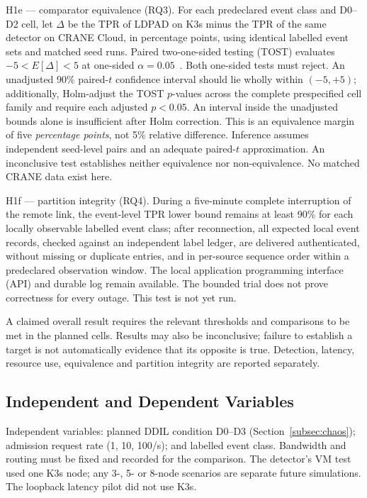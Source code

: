 \documentclass{ieeeaccess}
\renewcommand{\textbf}[1]{#1}
\begin{document}
\noindent\textbf{H1e --- comparator equivalence (RQ3).} For each predeclared event class and D0--D2 cell, let $\Delta$ be the TPR of LDPAD on K3s minus the TPR of the same detector on CRANE Cloud, in percentage points, using identical labelled event sets and matched seed runs. Paired two-one-sided testing (TOST) evaluates $-5< E[\Delta] <5$ at one-sided $\alpha=0.05$~\cite{b_tost}. Both one-sided tests must reject. An unadjusted 90\% paired-$t$ confidence interval should lie wholly within $(-5,+5)$; additionally, Holm-adjust the TOST $p$-values across the complete prespecified cell family and require each adjusted $p<0.05$. An interval inside the unadjusted bounds alone is insufficient after Holm correction. This is an equivalence margin of five \emph{percentage points}, not 5\% relative difference. Inference assumes independent seed-level pairs and an adequate paired-$t$ approximation. An inconclusive test establishes neither equivalence nor non-equivalence. No matched CRANE data exist here.

\noindent\textbf{H1f --- partition integrity (RQ4).} During a five-minute complete interruption of the remote link, the event-level TPR lower bound remains at least 90\% for each locally observable labelled event class; after reconnection, all expected local event records, checked against an independent label ledger, are delivered authenticated, without missing or duplicate entries, and in per-source sequence order within a predeclared observation window. The local application programming interface (API) and durable log remain available. The bounded trial does not prove correctness for every outage. This test is not yet run.

A claimed overall result requires the relevant thresholds and comparisons to be met in the planned cells. Results may also be inconclusive; failure to establish a target is not automatically evidence that its opposite is true. Detection, latency, resource use, equivalence and partition integrity are reported separately.

\subsection{Independent and Dependent Variables}
\label{subsec:variables}

{Independent variables:} planned DDIL condition D0--D3 (Section~\ref{subsec:chaos}); admission request rate (1, 10, 100/s); and labelled event class. Bandwidth and routing must be fixed and recorded for the comparison. The detector's VM test used one K3s node; any 3-, 5- or 8-node scenarios are separate future simulations. The loopback latency pilot did not use K3s.
\end{document}
